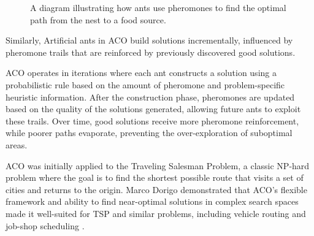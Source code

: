 \begin{figure}[t]
\centering
{}
\caption{A diagram illustrating how ants use pheromones to find the optimal path from the nest to a food source.}
\label{fig:ant_pheromone_path}
\end{figure}


Similarly, Artificial ants in ACO build solutions incrementally, influenced by pheromone trails that are reinforced by previously discovered good solutions.

ACO operates in iterations where each ant constructs a solution using a probabilistic rule based on the amount of pheromone and problem-specific heuristic information\cite{Dorigo2004}. After the construction phase, pheromones are updated based on the quality of the solutions generated, allowing future ants to exploit these trails. Over time, good solutions receive more pheromone reinforcement, while poorer paths evaporate, preventing the over-exploration of suboptimal areas.

ACO was initially applied to the Traveling Salesman Problem, a classic NP-hard problem where the goal is to find the shortest possible route that visits a set of cities and returns to the origin. Marco Dorigo demonstrated that ACO’s flexible framework and ability to find near-optimal solutions in complex search spaces made it well-suited for TSP and similar problems, including vehicle routing and job-shop scheduling \cite{Stutzle2011}.
\newpage

